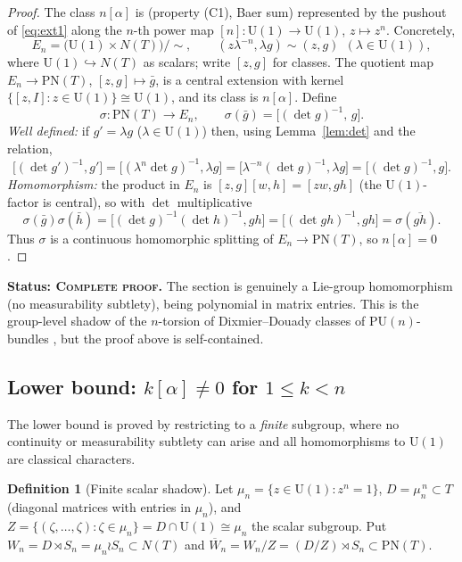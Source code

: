 \documentclass[11pt]{article}
\theoremstyle{definition}
\newtheorem{definition}[theorem]{Definition}
\newcommand{\U}{\mathrm{U}}
\newcommand{\PU}{\mathrm{PU}}
\newcommand{\PN}{\mathrm{PN}}
\newcommand{\Nt}{N(T)}
\newcommand{\Wn}{\overline{W}_{n}}
\newcommand{\STAT}[1]{\noindent\textbf{Status: #1}}
\newcommand{\COMPLETE}{\textsc{Complete proof}}
\begin{document}
\begin{proof}
The class $n[\alpha]$ is (property (C1), Baer sum) represented by the pushout of
\eqref{eq:ext1} along the $n$-th power map $[n]\colon\U(1)\to\U(1)$, $z\mapsto z^n$.
Concretely,
\[
E_n=\big(\U(1)\times\Nt\big)\big/\!\sim,\qquad
(z\lambda^{-n},\lambda g)\sim(z,g)\ \ (\lambda\in\U(1)),
\]
where $\U(1)\hookrightarrow\Nt$ as scalars; write $[z,g]$ for classes. The quotient map
$E_n\to\PN(T)$, $[z,g]\mapsto \bar g$, is a central extension with kernel
$\{[z,I]:z\in\U(1)\}\cong\U(1)$, and its class is $n[\alpha]$. Define
\[
\sigma\colon\PN(T)\longrightarrow E_n,\qquad \sigma(\bar g)=\big[(\det g)^{-1},\,g\big].
\]
\emph{Well defined:} if $g'=\lambda g$ ($\lambda\in\U(1)$) then, using
Lemma~\ref{lem:det} and the relation,
\[
\big[(\det g')^{-1},g'\big]=\big[(\lambda^n\det g)^{-1},\lambda g\big]
=\big[\lambda^{-n}(\det g)^{-1},\lambda g\big]=\big[(\det g)^{-1},g\big].
\]
\emph{Homomorphism:} the product in $E_n$ is $[z,g][w,h]=[zw,gh]$ (the $\U(1)$-factor is
central), so with $\det$ multiplicative
\[
\sigma(\bar g)\sigma(\bar h)=\big[(\det g)^{-1}(\det h)^{-1},gh\big]
=\big[(\det gh)^{-1},gh\big]=\sigma(\overline{gh}).
\]
Thus $\sigma$ is a continuous homomorphic splitting of $E_n\to\PN(T)$, so $n[\alpha]=0$.
\end{proof}
\STAT{\COMPLETE.} The section is genuinely a Lie-group homomorphism (no measurability
subtlety), being polynomial in matrix entries. This is the group-level shadow of the
$n$-torsion of Dixmier--Douady classes of $\PU(n)$-bundles \cite{DixmierDouady}, but the
proof above is self-contained.

\subsection{Lower bound: $k[\alpha]\neq0$ for $1\le k<n$}

The lower bound is proved by restricting to a \emph{finite} subgroup, where no continuity or
measurability subtlety can arise and all homomorphisms to $\U(1)$ are classical characters.

\begin{definition}[Finite scalar shadow]\label{def:shadow}
Let $\mu_n=\{z\in\U(1):z^n=1\}$, $D=\mu_n^{\,n}\subset T$ (diagonal matrices with entries in
$\mu_n$), and $Z=\{(\zeta,\dots,\zeta):\zeta\in\mu_n\}=D\cap\U(1)\cong\mu_n$ the scalar
subgroup. Put $W_n=D\rtimes S_n=\mu_n\wr S_n\subset\Nt$ and
$\Wn=W_n/Z=(D/Z)\rtimes S_n\subset\PN(T)$.
\end{definition}
\end{document}
